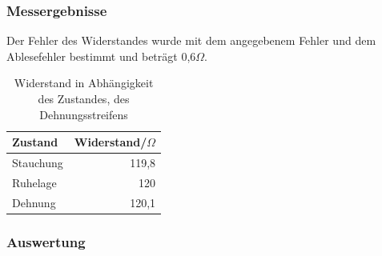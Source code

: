 \documentclass[12pt,a4paper]{article}
\begin{document}
\subsubsection*{Messergebnisse}

Der Fehler des Widerstandes wurde mit dem angegebenem Fehler und dem Ablesefehler bestimmt und beträgt 0,6$\Omega$.

\begin{table}[H]
\begin{center}
\begin{tabular}{|l|r|}
\hline
Zustand & \multicolumn{1}{l|}{Widerstand/$\Omega$} \\ \hline
Stauchung & 119,8 \\ \hline
Ruhelage & 120 \\ \hline
Dehnung & 120,1 \\ \hline
\end{tabular}
\end{center}
\caption{Widerstand in Abhängigkeit des Zustandes, des Dehnungsstreifens}
\label{tab:4_1}
\end{table}


\subsubsection*{Auswertung}
\end{document}
